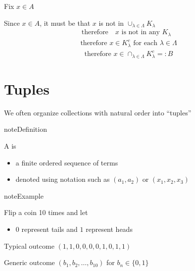 \documentclass[letterpaper,10pt,english]{jupyterBook}
\begin{document}
\sphinxAtStartPar
Fix \(x \in A\)

\sphinxAtStartPar
Since \(x \in A\), it must be that \(x\) is not in \(\cup_{\lambda \in \Lambda} K_{\lambda}\)
\begin{equation*}
\begin{split}
\text{therefore } \text{ $x$ is not in any $K_{\lambda}$ }
\end{split}
\end{equation*}\begin{equation*}
\begin{split}
\text{therefore } x \in K_{\lambda}^c \text{ for each } \lambda \in \Lambda
\end{split}
\end{equation*}\begin{equation*}
\begin{split}
\text{therefore } x \in \cap_{\lambda \in \Lambda} K_{\lambda}^{c} =: B
\end{split}
\end{equation*}

\section{Tuples}
\label{\detokenize{03.set_theory:tuples}}
\sphinxAtStartPar
We often organize collections with natural order into “tuples”

\begin{sphinxadmonition}{note}{Definition}

\sphinxAtStartPar
A  is
\begin{itemize}
\item {} 
\sphinxAtStartPar
a finite ordered sequence of terms

\item {} 
\sphinxAtStartPar
denoted using notation such as \((a_1, a_2)\) or \((x_1, x_2, x_3)\)

\end{itemize}
\end{sphinxadmonition}

\begin{sphinxadmonition}{note}{Example}

\sphinxAtStartPar
Flip a coin 10 times and let
\begin{itemize}
\item {} 
\sphinxAtStartPar
\(0\) represent tails and \(1\) represent heads

\end{itemize}

\sphinxAtStartPar
Typical outcome \((1, 1, 0, 0, 0, 0, 1, 0, 1, 1)\)

\sphinxAtStartPar
Generic outcome \((b_1, b_2, \ldots, b_{10})\)  for \(b_n \in \{0, 1\}\)
\end{sphinxadmonition}
\end{document}
